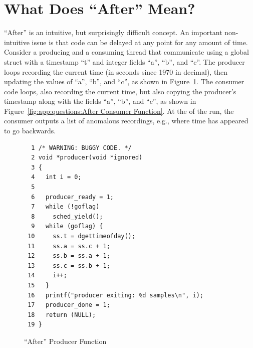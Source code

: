 
\section{What Does ``After'' Mean?}
\label{sec:app:questions:What Does ``After'' Mean?}

``After'' is an intuitive, but surprisingly difficult concept.
An important non-intuitive issue is that code can be delayed at
any point for any amount of time.
Consider a producing and a consuming thread that communicate using
a global struct with a timestamp ``t'' and integer fields ``a'', ``b'',
and ``c''.
The producer loops recording the current time
(in seconds since 1970 in decimal),
then updating the values of ``a'', ``b'', and ``c'',
as shown in Figure~\ref{fig:app:questions:After Producer Function}.
The consumer code loops, also recording the current time, but also
copying the producer's timestamp along with the fields ``a'',
``b'', and ``c'', as shown in
Figure~\ref{fig:app:questions:After Consumer Function}.
At the of the run, the consumer outputs a list of anomalous recordings,
e.g., where time has appeared to go backwards.

\begin{figure}[htbp]
{ \scriptsize
\begin{verbatim}
  1 /* WARNING: BUGGY CODE. */
  2 void *producer(void *ignored)
  3 {
  4   int i = 0;
  5 
  6   producer_ready = 1;
  7   while (!goflag)
  8     sched_yield();
  9   while (goflag) {
 10     ss.t = dgettimeofday();
 11     ss.a = ss.c + 1;
 12     ss.b = ss.a + 1;
 13     ss.c = ss.b + 1;
 14     i++;
 15   }
 16   printf("producer exiting: %d samples\n", i);
 17   producer_done = 1;
 18   return (NULL);
 19 }
\end{verbatim}
}
\caption{``After'' Producer Function}
\label{fig:app:questions:After Producer Function}
\end{figure}

